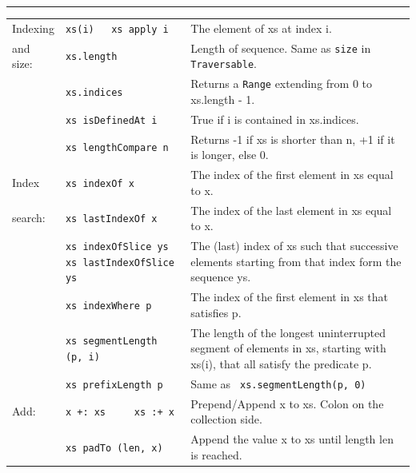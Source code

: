 \documentclass[article, a5paper]{memoir}
\newcommand{\LangColor}{red}
\newcommand{\head}[1]{{\bfseries {\color{\LangColor}{#1}}\par\vspace{1mm}\hrule\vspace{-2mm}}}
\renewcommand{\arraystretch}{0.9}
\newcommand{\Newline}{\vspace{\baselineskip}}
\begin{document}
{\Newline
\head{Methods in trait \texttt{Seq[A]}}\Newline

{\small\renewcommand{\arraystretch}{1.1}
\begin{tabular}{@{}l p{3.75cm} p{6.8cm}}


  Indexing & \texttt{xs(i)  ~ xs apply i} & The element of xs at index i.\\   \cline{2-3}

   and size: & \texttt{xs.length} & Length of sequence. Same as \texttt{size} in \texttt{Traversable}.\\\cline{2-3}
   & \texttt{xs.indices} & Returns a \texttt{Range} extending from 0 to xs.length - 1.\\\cline{2-3}
   & \texttt{xs isDefinedAt i} & True if i is contained in xs.indices.\\\cline{2-3}
   & \texttt{xs lengthCompare n} & Returns -1 if xs is shorter than n, +1 if it is longer, else 0. \\\cline{1-3}

  
  Index & \texttt{xs indexOf x} & The index of the first element in xs equal to x.\\   \cline{2-3}
  search: & \texttt{xs lastIndexOf x} & The index of the last element in xs equal to x.\\\cline{2-3}
   & \texttt{xs indexOfSlice ys \newline xs lastIndexOfSlice ys} & The (last) index of xs such that successive elements starting from that index form the sequence ys.\\\cline{2-3}
   & \texttt{xs indexWhere p} & The index of the first element in xs that satisfies p.\\\cline{2-3}
   & \texttt{xs segmentLength (p, i)} & The length of the longest uninterrupted segment of elements in xs, starting with xs(i), that all satisfy the predicate p.\\\cline{2-3}
   & \texttt{xs prefixLength p} &  	Same as \texttt{ xs.segmentLength(p, 0)}\\\cline{1-3}


  Add: & {\texttt{x~+:~xs~~~~~xs~:+~x}}  & Prepend/Append x to xs. Colon on the collection side. \\   \cline{2-3}
   & \texttt{xs padTo (len, x)} & Append the value x to xs until length len is reached.\\\cline{1-3}
        


\end{tabular}}}
\end{document}

